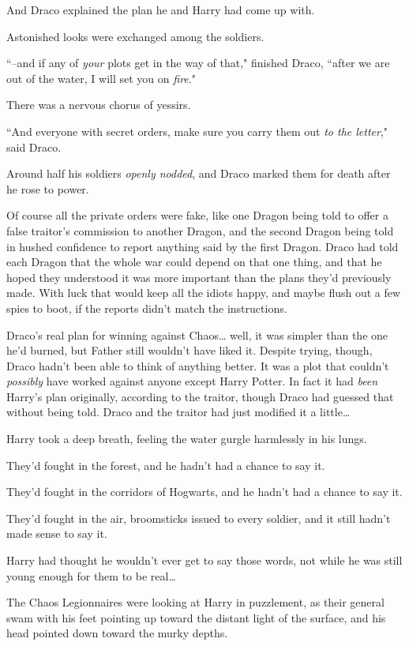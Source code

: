 And Draco explained the plan he and Harry had come up with.

Astonished looks were exchanged among the soldiers.

``\---and if any of \emph{your} plots get in the way of that," finished Draco, ``after we are out of the water, I will set you on \emph{fire}."

There was a nervous chorus of yessirs.

``And everyone with secret orders, make sure you carry them out \emph{to the letter}," said Draco.

Around half his soldiers \emph{openly nodded}, and Draco marked them for death after he rose to power.

Of course all the private orders were fake, like one Dragon being told to offer a false traitor's commission to another Dragon, and the second Dragon being told in hushed confidence to report anything said by the first Dragon. Draco had told each Dragon that the whole war could depend on that one thing, and that he hoped they understood it was more important than the plans they'd previously made. With luck that would keep all the idiots happy, and maybe flush out a few spies to boot, if the reports didn't match the instructions.

Draco's real plan for winning against Chaos{\ldots} well, it was simpler than the one he'd burned, but Father still wouldn't have liked it. Despite trying, though, Draco hadn't been able to think of anything better. It was a plot that couldn't \emph{possibly} have worked against anyone except Harry Potter. In fact it had \emph{been} Harry's plan originally, according to the traitor, though Draco had guessed that without being told. Draco and the traitor had just modified it a little{\ldots}

\later

Harry took a deep breath, feeling the water gurgle harmlessly in his lungs.

They'd fought in the forest, and he hadn't had a chance to say it.

They'd fought in the corridors of Hogwarts, and he hadn't had a chance to say it.

They'd fought in the air, broomsticks issued to every soldier, and it still hadn't made sense to say it.

Harry had thought he wouldn't ever get to say those words, not while he was still young enough for them to be real{\ldots}

The Chaos Legionnaires were looking at Harry in puzzlement, as their general swam with his feet pointing up toward the distant light of the surface, and his head pointed down toward the murky depths.

